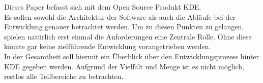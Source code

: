 Dieses Paper befasst sich mit dem Open Source Produkt KDE.\\
Es sollen sowohl die Architektur der Software als auch die Abläufe bei der Entwicklung genauer betrachtet werden. Um zu diesen Punkten zu gelangen, spielen natürlich erst einmal die Anforderungen eine Zentrale Rolle. Ohne diese könnte gar keine zielführende Entwicklung vorangetrieben werden.\\
In der Gesamtheit soll hiermit ein Überblick über den Entwicklungsprozess hinter KDE gegeben werden. Aufgrund der Vielfalt und Menge ist es nicht möglich, restlos alle Teilbereiche zu betrachten. 